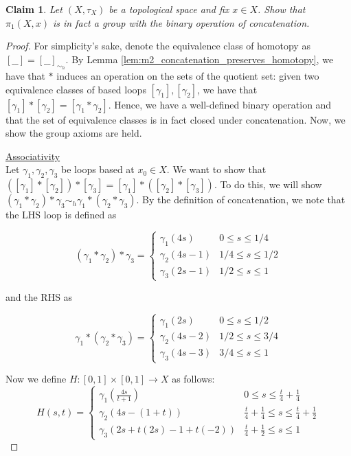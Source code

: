 \documentclass{article}
\newtheorem{claim}{Claim}[section]
\theoremstyle{definition}
\newcommand{\topspace}[1]{$(#1, \tau_{#1})$}
\begin{document}
\begin{claim}
Let \topspace{X} be a topological space and fix $x \in X$. Show that $\pi_{1}(X,x)$ is in fact a group with the binary operation of concatenation.
\end{claim}
\begin{proof}
For simplicity's sake, denote the equivalence class of homotopy as $[\_\_] = [\_\_]_{\sim_h}$. By Lemma \ref{lem:m2_concatenation_preserves_homotopy}, we have that $*$ induces an operation on the sets of the quotient set: given two equivalence classes of based loops $[\gamma_1], [\gamma_2]$, we have that $[\gamma_1]*[\gamma_2] = [\gamma_1 * \gamma_2]$. Hence, we have a well-defined binary operation and that the set of equivalence classes is in fact closed under concatenation. Now, we show the group axioms are held. 

\underline{Associativity}\\
Let $\gamma_1, \gamma_2, \gamma_3$ be loops based at $x_0 \in X$. We want to show that $([\gamma_1]*[\gamma_2])*[\gamma_3]=[\gamma_1]*([\gamma_2]*[\gamma_3])$. To do this, we will show $(\gamma_1*\gamma_2)*\gamma_3 \sim_h \gamma_1*(\gamma_2*\gamma_3)$. By the definition of concatenation, we note that the LHS loop is defined as 

\begin{equation*}
    (\gamma_1*\gamma_2)*\gamma_3 =
    \begin{cases}
    \gamma_1(4s) & 0 \leq s \leq 1/4\\
    \gamma_2(4s-1) & 1/4 \leq s \leq 1/2\\
    \gamma_3(2s-1) & 1/2 \leq s \leq 1
    \end{cases}
\end{equation*}

and the RHS as 

\begin{equation*}
    \gamma_1*(\gamma_2*\gamma_3) =
    \begin{cases}
    \gamma_1(2s) & 0 \leq s \leq 1/2\\
    \gamma_2(4s-2) & 1/2 \leq s \leq 3/4\\
    \gamma_3(4s-3) & 3/4 \leq s \leq 1
    \end{cases}
\end{equation*}

Now we define $H: [0,1] \times [0,1] \to X$ as follows:
\begin{equation*}
    H(s,t) =
    \begin{cases}
    \gamma_1(\frac{4s}{t+1}) & 0 \leq s \leq \frac{t}{4} + \frac{1}{4}\\
    \gamma_2(4s-(1+t)) & \frac{t}{4} + \frac{1}{4} \leq s \leq \frac{t}{4} + \frac{1}{2}\\
    \gamma_3(2s+t(2s)-1+t(-2)) & \frac{t}{4} + \frac{1}{2} \leq s \leq 1
    \end{cases}
\end{equation*}


\end{proof}
\end{document}
